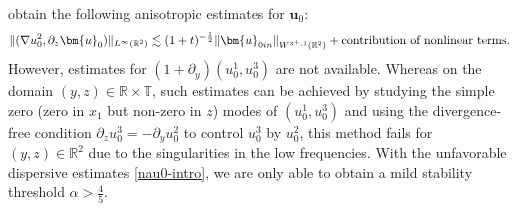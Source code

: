 \documentclass[11pt,reqno]{article}
\numberwithin{equation}{section}
\newcommand\R{{\mathbb R}}
\newcommand\T{{\mathbb T}}
\newcommand\uu{\bm{u}}
\let\pa=\partial
\let\f=\frac
\begin{document}
 obtain the following anisotropic estimates for $\uu_0:$	
\begin{align} \label{nau0-intro}
	\|(\nabla u_0^2,\partial_z\uu_0 ) \|_{L^{\infty}(\R^2)}
	\lesssim (1+t)^{-\f12}\|\uu_{0in}\|_{%
    W^{3^{+},1}(\R^2)}
    +\text{contribution of nonlinear terms.}
\end{align}	
However, estimates for $(1+\pa_y)(u_0^1, u_0^3)$ are not available. 
Whereas on the domain $(y,z)\in \R\times\T$, such estimates can be achieved by studying the simple zero (zero in $x_1$ but non-zero in $z$) modes of $(u_0^1, u_0^3)$ and using the divergence-free condition $\pa_z u_0^3=-\pa_y u_0^2$ to control $u_0^3$ by $u_0^2$, this method fails for $(y,z)\in \R^2$ due to the singularities in the low  frequencies.
With the unfavorable dispersive estimates \eqref{nau0-intro}, we are only able to obtain a mild stability threshold $\alpha>\f45$. %
\end{document}
